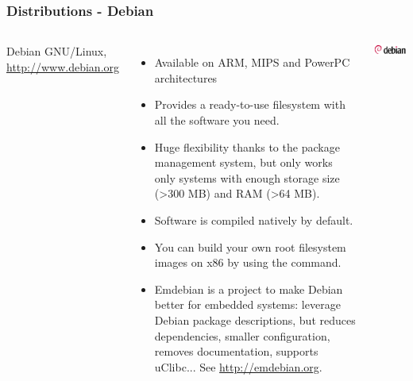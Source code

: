 \begin{frame}
  \frametitle{Distributions - Debian}
  \small
  \begin{columns}[T]
    Debian GNU/Linux, \url{http://www.debian.org}
    \begin{itemize}
    \item Available on ARM, MIPS and PowerPC architectures
    \item Provides a ready-to-use filesystem with all the software you
      need.
    \item Huge flexibility thanks to the package management system,
      but only works only systems with enough storage size
      (\textgreater 300 MB) and RAM (\textgreater 64 MB).
    \item Software is compiled natively by default.
    \item You can build your own root filesystem images on x86 by
      using the  command.
    \item Emdebian is a project to make Debian better for embedded
      systems: leverage Debian package descriptions, but reduces
      dependencies, smaller configuration, removes documentation,
      supports uClibc... See \url{http://emdebian.org}.
    \end{itemize}
    \includegraphics[width=\textwidth]{slides/sysdev-embedded-linux/debian.png}\\
  \end{columns}
\end{frame}


